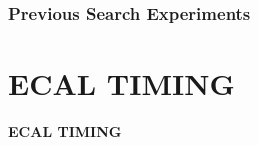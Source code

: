 \documentclass{beamer}
\begin{document}
\begin{frame}
\frametitle{Previous Search Experiments}
\end{frame}




\section{ECAL TIMING}
{
\begin{frame}
   \begin{center}
    \textcolor{UMN@Maroon}{\huge{\textbf{ECAL TIMING}}}
   \end{center}
\end{frame}
}
\end{document}
